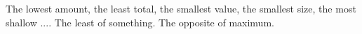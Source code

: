 The lowest amount, the least total, the smallest value, the smallest
size, the most shallow ....  
The least of something. 
The opposite of maximum.